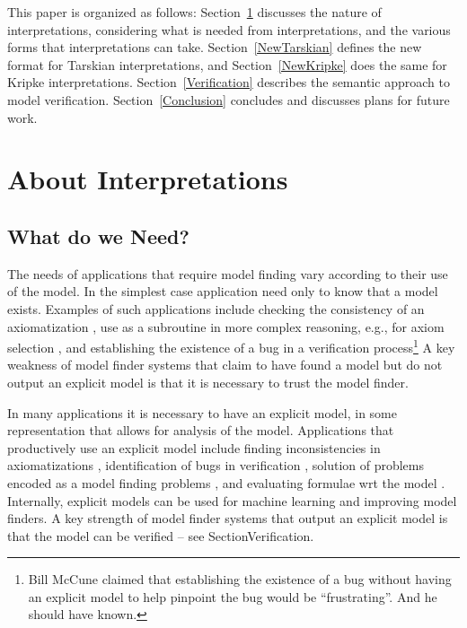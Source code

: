 \documentclass{easychair}
\begin{document}
\vspace*{1em}
This paper is organized as follows:
Section~\ref{Interpretations} discusses the nature of interpretations, considering what is
needed from interpretations, and the various forms that interpretations can take.
Section~\ref{NewTarskian} defines the new format for Tarskian interpretations, and
Section~\ref{NewKripke} does the same for Kripke interpretations.
Section~\ref{Verification} describes the semantic approach to model verification.
Section~\ref{Conclusion} concludes and discusses plans for future work.

\section{About Interpretations}
\label{Interpretations}

\subsection{What do we Need?}
\label{Need}

The needs of applications that require model finding vary according to their use of the model.
In the simplest case application need only to know that a model exists.
Examples of such applications include checking the consistency of an axiomatization \cite{CI15},
use as a subroutine in more complex reasoning, e.g., for
axiom selection \cite{SP07,Pud07-ESARLT}, and establishing the existence of a bug in a
verification process\footnote{%
Bill McCune claimed that establishing the existence of a bug without having an explicit model
to help pinpoint the bug would be ``frustrating''. And he should have known.}
A key weakness of model finder systems that claim to have found a model but do not output an 
explicit model is that it is necessary to trust the model finder.

In many applications it is necessary to have an explicit model, in some representation that
allows for analysis of the model.
Applications that productively use an explicit model include finding inconsistencies in 
axiomatizations \cite{SS+17}, identification of bugs in verification \cite{CE82,QS82},
solution of problems encoded as a model finding problems \cite{Win82}, and evaluating formulae
wrt the model \cite{SS+23-LPAR}.
Internally, explicit models can be used for machine learning and improving model finders.
A key strength of model finder systems that output an explicit model is that the model can
be verified -- see Section{Verification}.
\end{document}
